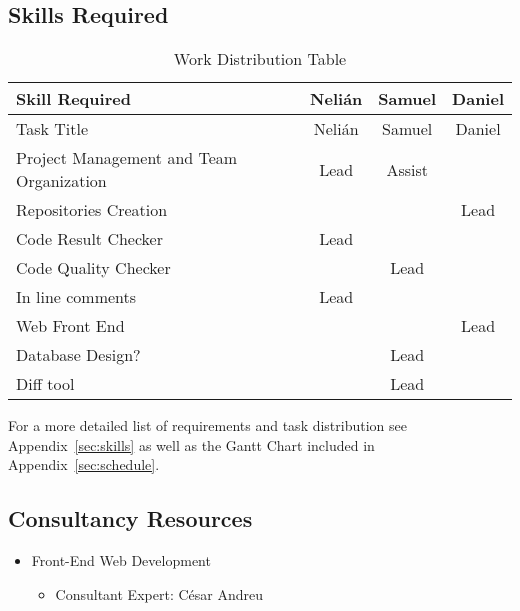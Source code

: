 
\subsection{Skills Required}
\begin{center}
\setlength{\extrarowheight}{1.5pt}
    \begin{longtable}{|m{3.25in}|c|c|c|}
 \caption{Work Distribution Table} \\
     \hline
    
    \centering Skill Required & Nelián & Samuel & Daniel \\
    \hline \hline \endfirsthead
    
         \hline

	\centering Task Title & Nelián & Samuel & Daniel \\    
	\hline \hline \endhead
    
    \endfoot    
    
    Project Management and Team Organization & Lead  & Assist &  \\ \hline
    Repositories Creation &       &       & Lead \\  \hline
    Code Result Checker & Lead  &       &  \\  \hline
    Code Quality Checker &       & Lead  &  \\  \hline
    In line comments & Lead  &       &  \\  \hline
    Web Front End &       &       & Lead \\  \hline
    Database Design? &       & Lead  &  \\  \hline
    Diff tool &       & Lead  &  \\  \hline
     \end{longtable}
\end{center}

For a more detailed list of requirements and task distribution see Appendix~\ref{sec:skills} as well as the Gantt Chart included in Appendix~\ref{sec:schedule}.
\subsection{Consultancy Resources}
\begin{itemize}
\item Front-End Web Development
\begin{itemize}
\item Consultant Expert: César Andreu
\end{itemize}
\end{itemize}